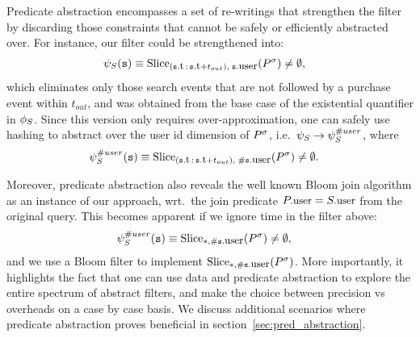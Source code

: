 Predicate abstraction encompasses a set of re-writings 
that strengthen the filter by discarding those constraints that cannot be safely
or efficiently abstracted over.
For instance, our filter could be strengthened into:
\begin{align*}
&
\PrecedesPPP(\symv{s}) \equiv 
\slice{\syms{P}}
{(\facc{\symv{s}}{t}\,:\,\facc{\symv{s}}{t} + t_{out}),\; 
	\facc{\symv{s}}{user}}
 \neq \emptyset,
\end{align*} 
which eliminates only those search events that are not followed by a purchase
event within $t_{out}$, and was obtained from the base case of
the existential quantifier in $\phi_{S}$.
Since this version only requires over-approximation, one can safely use hashing
to abstract over the user id dimension of ${P}^{\sigma}$, i.e.\ 
$\psi_S \rightarrow \psi_S^{\# user}$, where
\begin{align*}
&
\PrecedesPPP^{\hashid{user}}(\symv{s}) \equiv 
\slice{\syms{P}}
{(\facc{\symv{s}}{t}\,:\,\facc{\symv{s}}{t} + t_{out}),\; 
	\hashid{\facc{\symv{s}}{user}}}
 \neq \emptyset .
\end{align*}

Moreover, predicate abstraction also reveals the well known Bloom
join algorithm as an instance of our approach, wrt.\ the join
predicate $\facc{P}{user} = \facc{S}{user}$ from the original query. 
This becomes apparent if we ignore time in the filter above:
\begin{align*}
&
\PrecedesPPP^{\hashid{user}}(\symv{s}) \equiv 
\slice{\syms{P}}{*, \hashid{\facc{\symv{s}}{user}}}
 \neq \emptyset,
\end{align*}
and we use a Bloom filter to implement 
$\slice{\syms{P}}{*, \hashid{\facc{\symv{s}}{user}}}$.
More importantly, it highlights the fact that one can use data and predicate 
abstraction to explore the entire spectrum of abstract filters, and make the 
choice between precision vs overheads on a case by case basis.
We discuss additional scenarios where predicate abstraction proves
beneficial in section~\ref{sec:pred_abstraction}.




